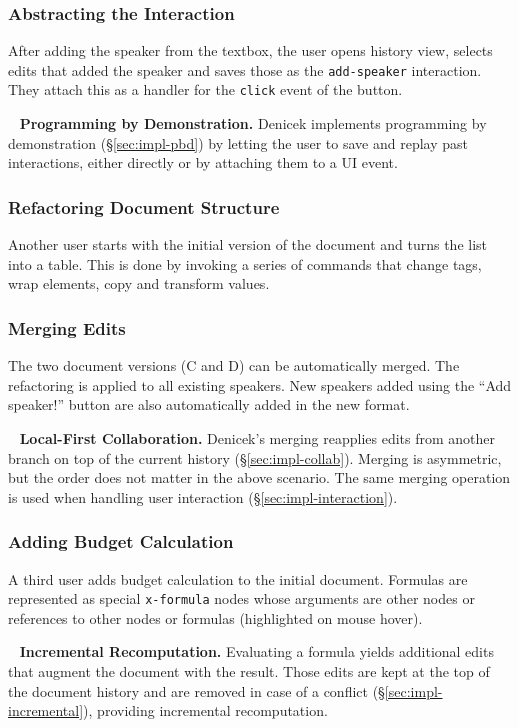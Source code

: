 \documentclass[sigconf,anonymous,screen]{acmart}
\newcommand*\circled[1]{\textnormal{\footnotesize\sffamily\bfseries\protect\tikz[baseline=(char.base)]{
  \node[shape=circle,fill=black,text=white,draw,inner sep=1pt] (char) {#1};}}}
\DeclareRobustCommand{\keyideabox}[3]{\begin{tcolorbox}[breakable,
  boxsep=5pt,left=0pt,right=0pt,top=0pt,bottom=0pt,width=\dimexpr\columnwidth\relax,
  colback=gray!20,colframe=gray!20,
  enlarge bottom by=0pt,enlarge top by=0pt,
  arc=0pt,outer arc=0pt]
\lettrine[lraise=0.3]{\LARGE #1}{~}
\small \textbf{#2.} #3
\end{tcolorbox}
}
\begin{document}
\subsubsection*{\circled{C} Abstracting the Interaction} After adding the speaker from the textbox,
the user opens history view, selects edits that added the speaker and saves those as the
{\small\Verb_add-speaker_} interaction. They attach this as a handler for the {\small\Verb_click_} event of the button.

\keyideabox{\faLightbulbO}{Programming by Demonstration}{Denicek implements programming by
demonstration (\S\ref{sec:impl-pbd}) by letting the user to save and replay past interactions,
either directly or by attaching them to a UI event.}

\subsubsection*{\circled{D} Refactoring Document Structure} Another user starts with the initial
version of the document and turns the list into a table. This is done by invoking a series of
commands that change tags, wrap elements, copy and transform values.

\subsubsection*{\circled{E} Merging Edits} The two document versions (C and D) can be automatically merged.
The refactoring is applied to all existing speakers. New speakers added using the ``Add speaker!''
button are also automatically added in the new format.

\keyideabox{\faLightbulbO}{Local-First Collaboration}{Denicek's merging
reapplies edits from another branch on top of the current history (\S\ref{sec:impl-collab}).
Merging is asymmetric, but the order does not matter in the above scenario. The same merging
operation is used when handling user interaction (\S\ref{sec:impl-interaction}).}

\subsubsection*{\circled{F} Adding Budget Calculation} A third user adds budget calculation to
the initial document. Formulas are represented as special {\small\Verb_x-formula_} nodes whose arguments
are other nodes or references to other nodes or formulas (highlighted on mouse hover).

\keyideabox{\faLightbulbO}{Incremental Recomputation}{Evaluating a formula yields additional
edits that augment the document with the result. Those edits are kept
at the top of the document history and are removed in case of a conflict (\S\ref{sec:impl-incremental}),
providing incremental recomputation.}
\end{document}
